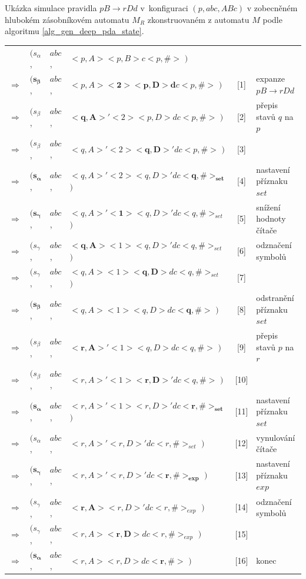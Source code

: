 \begin{Example}
\setlength{\tabcolsep}{\deftabcolsep}

\newpage
Ukázka simulace pravidla $pB \rightarrow r Dd$ v~konfiguraci $(p, abc, ABc)$ v zobecněném hlubokém zásobníkovém automatu $M_{R}$ zkonstruovaném z automatu $M$ podle algoritmu \ref{alg_gen_deep_pda_state}.\bigskip

\begin{tabular}{llllc|l}
                & $( s_{\alpha}$,  & $abc$, & $<p,A> <p,B> c <p, \#>$         $)$ & &  \\
$\Rightarrow$   & $( \mathbf{s_{\beta}}$,   & $abc$, & $<p,A> \mathbf{<2> <p,D> d} c <p, \#>$   $)$ & [1] & expanze $pB \rightarrow r Dd$ \\
$\Rightarrow$   & $( s_{\beta}$,   & $abc$, & $\mathbf{<q,A>'} <2> <p,D> d c <p, \#>$         $)$  & [2] & přepis stavů $q$ na $p$\\
$\Rightarrow$   & $( s_{\beta}$,   & $abc$, & $<q,A>' <2> \mathbf{<q,D>'} d c <p, \#>$         $)$  & [3] & \\
$\Rightarrow$   & $( \mathbf{s_{\alpha}}$,   & $abc$, & $<q,A>' <2> <q,D>' d c \mathbf{<q, \#>_{set}}$         $)$  & [4] & nastavení příznaku $set$\\
$\Rightarrow$   & $( \mathbf{s_{\gamma}}$,  & $abc$, & $<q,A>' \mathbf{<1>} <q,D>' d c <q, \#>_{set}$  $)$  & [5] & snížení hodnoty čítače \\
$\Rightarrow$   & $( s_{\gamma}$,  & $abc$, & $\mathbf{<q,A>} <1> <q,D>' d c <q, \#>_{set}$  $)$  & [6] & odznačení symbolů \\
$\Rightarrow$   & $( s_{\gamma}$,  & $abc$, & $<q,A> <1> \mathbf{<q,D>} d c <q, \#>_{set}$  $)$  & [7] &  \\
$\Rightarrow$   & $( \mathbf{s_{\beta}}$,  & $abc$, & $<q,A> <1> <q,D> d c \mathbf{<q, \#>}$  $)$  & [8] &  odstranění příznaku $set$\\
$\Rightarrow$   & $( s_{\beta}$,  & $abc$, & $\mathbf{<r,A>'} <1> <q,D> d c <q, \#>$  $)$  & [9] &  přepis stavů $p$ na $r$\\
$\Rightarrow$   & $( s_{\beta}$,  & $abc$, & $<r,A>' <1> \mathbf{<r,D>'} d c <q, \#>$  $)$  & [10] &  \\
$\Rightarrow$   & $( \mathbf{s_{\alpha}}$,  & $abc$, & $<r,A>' <1> <r,D>' d c \mathbf{<r, \#>_{set}}$  $)$  & [11] &  nastavení příznaku $set$\\
$\Rightarrow$   & $( s_{\alpha}$,  & $abc$, & $<r,A>' <r,D>' d c <r, \#>_{set}$  $)$  & [12] &  vynulování čítače\\
$\Rightarrow$   & $( \mathbf{s_{\gamma}}$,  & $abc$, & $<r,A>' <r,D>' d c \mathbf{<r, \#>_{exp}}$  $)$  & [13] &  nastavení příznaku $exp$\\
$\Rightarrow$   & $( s_{\gamma}$,  & $abc$, & $\mathbf{<r,A>} <r,D>' d c <r, \#>_{exp}$  $)$  & [14] &  odznačení symbolů\\
$\Rightarrow$   & $( s_{\gamma}$,  & $abc$, & $<r,A> \mathbf{<r,D>} d c <r, \#>_{exp}$  $)$  & [15] &  \\
$\Rightarrow$   & $( \mathbf{s_{\alpha}}$,  & $abc$, & $<r,A> <r,D> d c \mathbf{<r, \#>}$  $)$  & [16] &  konec


\end{tabular}
\end{Example}
